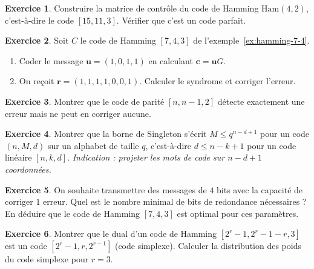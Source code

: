 \documentclass[12pt,a4paper,openany]{book}
\theoremstyle{definition}
\newtheorem{exercice}{Exercice}[chapter]
\theoremstyle{plain}
\theoremstyle{remark}
\begin{document}
\begin{exercice}
Construire la matrice de contrôle du code de Hamming $\mathrm{Ham}(4, 2)$,
c'est-à-dire le code $[15, 11, 3]$. Vérifier que c'est un code parfait.
\end{exercice}

\begin{exercice}
Soit $C$ le code de Hamming $[7,4,3]$ de l'exemple~\ref{ex:hamming-7-4}.
\begin{enumerate}[label=(\alph*)]
  \item Coder le message $\mathbf{u} = (1,0,1,1)$ en calculant
        $\mathbf{c} = \mathbf{u}G$.
  \item On reçoit $\mathbf{r} = (1,1,1,1,0,0,1)$. Calculer le syndrome
        et corriger l'erreur.
\end{enumerate}
\end{exercice}

\begin{exercice}
Montrer que le code de parité $[n, n-1, 2]$ détecte exactement une erreur
mais ne peut en corriger aucune.
\end{exercice}

\begin{exercice}
Montrer que la borne de Singleton s'écrit $M \leq q^{n-d+1}$ pour un
code $(n, M, d)$ sur un alphabet de taille $q$, c'est-à-dire $d \leq n-k+1$
pour un code linéaire $[n,k,d]$.
\textit{Indication : projeter les mots de code sur $n-d+1$ coordonnées.}
\end{exercice}

\begin{exercice}
On souhaite transmettre des messages de $4$ bits avec la capacité de
corriger $1$ erreur. Quel est le nombre minimal de bits de redondance
nécessaires ? En déduire que le code de Hamming $[7,4,3]$ est optimal
pour ces paramètres.
\end{exercice}

\begin{exercice}
Montrer que le dual d'un code de Hamming $[2^r - 1, 2^r - 1 - r, 3]$ est
un code $[2^r - 1, r, 2^{r-1}]$ (code simplexe). Calculer la distribution
des poids du code simplexe pour $r=3$.
\end{exercice}

\bigskip
\begin{center}
\end{center}
\end{document}
